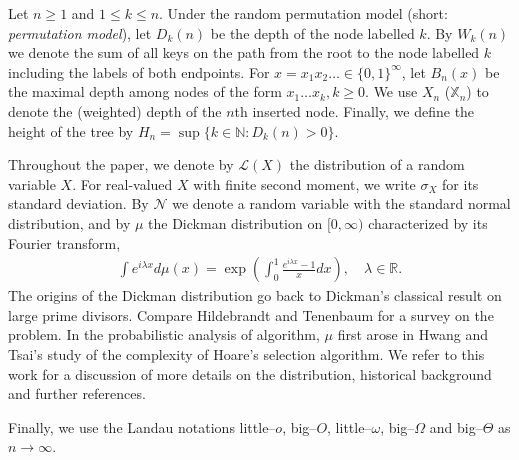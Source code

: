 \documentclass{amsart}       %
\newcommand{\sN}{\mathcal N}
\newcommand{\N}{\ensuremath{\mathbb N}}
\newcommand{\R}{\ensuremath{\mathbb{R}}}
\newcommand{\Law}{\mathcal{L}}
\begin{document}
Let $n \geq 1$ and $1 \leq k \leq n$. Under the random permutation model (short: \emph{permutation model}), let $D_k(n)$ be the depth of the node labelled $k$. 
By $W_k(n)$ we denote the sum of all keys on the path from the root to the node labelled $k$ including the labels of both endpoints. 
For $x = x_1 x_2 \ldots \in \{0,1\}^\infty$,  let $B_n(x)$ be the maximal depth among nodes of the form $x_1 \ldots x_k, k \geq 0$.
We use $X_n$ ($\mathbb X_n$) to denote the (weighted) depth of the $n$th inserted node. Finally, we define the height of the tree by 
 $H_n = \sup \{k \in \N : D_k(n) > 0\}$.

Throughout the paper, we denote by $\Law(X)$ the distribution of a random variable $X$. For real-valued $X$ with finite second moment, we write $\sigma_X$ for its standard deviation. 
By $\sN$ we denote a random variable with the standard normal distribution, and by $\mu$ the Dickman distribution on $[0, \infty)$ characterized by its Fourier transform,
\begin{align} \label{fourier_dickman} \int e^{i \lambda x} d \mu(x) = \exp \left( \int_0^1 \frac{e^{i \lambda x}-1}{x} dx\right), \quad \lambda \in \R. \end{align}
The origins of the Dickman distribution go back to Dickman's \cite{dickman1930} classical result on large prime divisors. Compare Hildebrandt and Tenenbaum \cite{hildetenen} for a survey on the problem. 
In the probabilistic analysis of algorithm, $\mu$ first arose in Hwang and Tsai's \cite{hwangtsai} study of the complexity of Hoare's selection algorithm. 
We refer to this work for a discussion of more details on the distribution, historical background and further references.

Finally, we use the Landau notations little--$o$, big--$O$, little--$\omega$, big--$\Omega$ and big--$\Theta$ as $n \to \infty$. 
\end{document}

